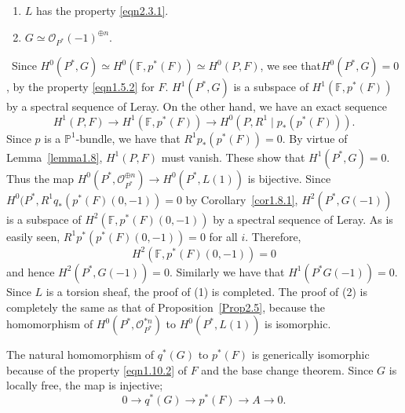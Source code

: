 \begin{lemma}\label{lemma3.1}
\begin{enumerate}
\renewcommand{\labelenumi}{(\theenumi)}
\item $L$ has the property \eqref{eqn2.3.1}.
\item $G\simeq \mathscr{O}_{P^{\ast}}(-1)^{\oplus n}$.
\end{enumerate}
\end{lemma}

\begin{Proof}
~Since $H^{0}(P^{\ast}, G)\simeq H^{0}(\mathbb{F}, p^{\ast}(F))\simeq
H^{0}(P,F)$, we see that\break $H^{0}(P^{\ast},G)=0$, by the property
\eqref{eqn1.5.2} for $F$. $H^{1}(P^{\ast},G)$ is a subspace of
$H^{1}(\mathbb{F},p^{\ast}(F))$ by a spectral sequence of Leray. On
the other hand, we have an exact sequence 
$$
H^{1}(P,F)\to H^{1}(\mathbb{F},p^{\ast}(F))\to H^{0}\left(P,R^{1}\mid p_{\ast}(p^{\ast}(F))\right).
$$
\pageoriginale
Since $p$ is a $\mathbb{P}^{1}$-bundle, we have that
$R^{1}p_{\ast}(p^{\ast}(F))=0$. By virtue of Lemma~\ref{lemma1.8},
$H^{1}(P,F)$ must vanish. These show that $H^{1}(P^{\ast},G)=0$. Thus
the map $H^{0}\left(P^{\ast},\mathscr{O}_{P^{\ast}}^{\oplus
  n}\right)\to H^{0}\left(P^{\ast},L(1)\right)$ is bijective. Since
$H^{0}(P^{\ast},R^{1}q_{\ast}(p^{\ast}(F)(0,-1))=0$ by
Corollary~\ref{cor1.8.1}, $H^{2}(P^{\ast},G(-1))$ is a subspace of
$H^{2}(\mathbb{F},p^{\ast}(F)(0,-1))$ by a spectral sequence of
Leray. As is easily seen, $R^{1}p^{\ast}(p^{\ast}(F)(0, -1))=0$ for
all $i$. Therefore, 
$$
H^{2}(\mathbb{F},p^{\ast}(F)(0,-1))=0
$$
and hence
$H^{2}(P^{\ast},G(-1))=0$. Similarly we have that
$H^{1}(P^{\ast}G(-1))=0$. Since $L$ is a torsion sheaf, the proof of
(1) is completed. The proof of (2) is completely the same as that of
Proposition~\ref{Prop2.5}, because the homomorphism of
$H^{0}(P^{\ast},\mathscr{O}^{\ast n}_{P^{\ast}})$ to
$H^{0}(P^{\ast},L(1))$ is isomorphic.
\enprf
\end{Proof}

The natural homomorphism of $q^{\ast}(G)$ to $p^{\ast}(F)$ is
generically isomorphic because of the property \eqref{eqn1.10.2} of
$F$ and the base change theorem. Since $G$ is locally free, the map is
injective; 
\setcounter{equation}{1}
\begin{equation*}
0\to q^{\ast}(G)\to p^{\ast}(F)\to A\to 0.\tag{3.2}\label{eqn3.2}
\end{equation*}

